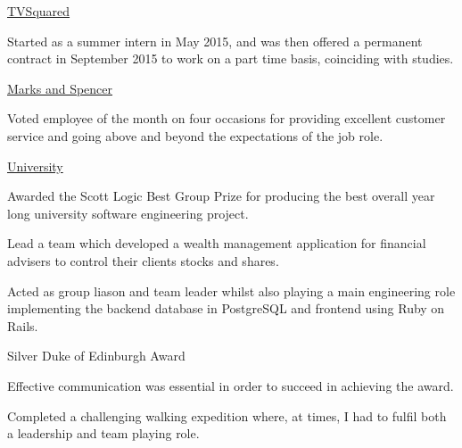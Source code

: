 \begin{cventries}
  \cventry
    {\href{http://tvsquared.com/}{TVSquared}}
    {}
    {}
    {}
    {
      \begin{cvitems}
        \item {Started as a summer intern in May 2015, and was then offered a permanent contract in September 2015 to work on a part time basis, coinciding with studies.}
      \end{cvitems}
    }
  \cventry
    {\href{http://www.marksandspencer.com/}{Marks and Spencer}}
    {}
    {}
    {}
    {
      \begin{cvitems}
        \item {Voted employee of the month on four occasions for providing excellent customer service and going above and beyond the expectations of the job role.}
      \end{cvitems}
    }
  \cventry
    {\href{https://www.hw.ac.uk/}{University}}
    {}
    {}
    {}
    {
      \begin{cvitems}
        \item {Awarded the Scott Logic Best Group Prize for producing the best overall year long university software engineering project.}
        \item {Lead a team which developed a wealth management application for financial advisers to control their clients stocks and shares.}
        \item {Acted as group liason and team leader whilst also playing a main engineering role implementing the backend database in PostgreSQL and frontend using Ruby on Rails.}
      \end{cvitems}
    }
  \cventry
    {Silver Duke of Edinburgh Award}
    {}
    {}
    {}
    {
      \begin{cvitems}
        \item {Effective communication was essential in order to succeed in achieving the award.}
        \item {Completed a challenging walking expedition where, at times, I had to fulfil both a leadership and team playing role.}
      \end{cvitems}
    }
\end{cventries}
